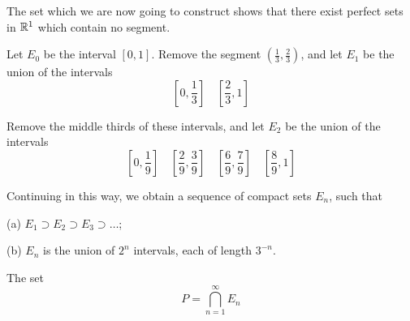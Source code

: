 \begin{myDef}
    \label{myDef:2.44}
	 The set which we are now going to construct shows
	that there exist perfect sets in ${\protect\mathbb R}^{1}$ which contain no segment.
\end{myDef}


Let $E_0$ be the interval $[0, 1]$. Remove the segment $(\frac{1}{3}, \frac{2}{3})$, and let $E_1$ be the union of the intervals
\begin{equation*}
    \left[0, \frac{1}{3}\right] \quad 
    \left[\frac{2}{3}, 1\right]
\end{equation*}

Remove the middle thirds of these intervals, and let $E_2$ be the union of the intervals
\begin{equation*}
    \left[0, \frac{1}{9}\right] \quad 
    \left[\frac{2}{9}, \frac{3}{9}\right] \quad 
    \left[\frac{6}{9}, \frac{7}{9}\right] \quad 
    \left[\frac{8}{9}, 1\right]
\end{equation*}

Continuing in this way, we obtain a sequence of compact sets $E_n$, such that

(a) $E_1 \supset E_2 \supset E_3 \supset \dots$;

(b) $E_n$ is the union of $2^n$ intervals, each of length $3^{-n}$.

The set
\begin{equation*}
    P = \bigcap_{n=1}^{\infty} E_n
\end{equation*}

